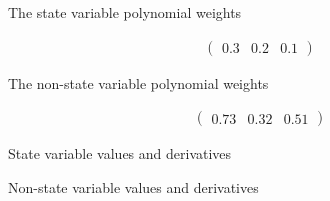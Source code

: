 The state variable polynomial weights

\begin{gather*}
  \left(
\begin{array}{ccc}
 0.3 & 0.2 & 0.1
\end{array}
\right)
\end{gather*}

The non-state variable polynomial weights

\begin{gather*}
  \left(
\begin{array}{ccc}
 0.73 & 0.32 & 0.51
\end{array}
\right)
\end{gather*}




State variable values and derivatives


\begin{description}
\end{description}


Non-state variable values and derivatives


\begin{description}
\end{description}
